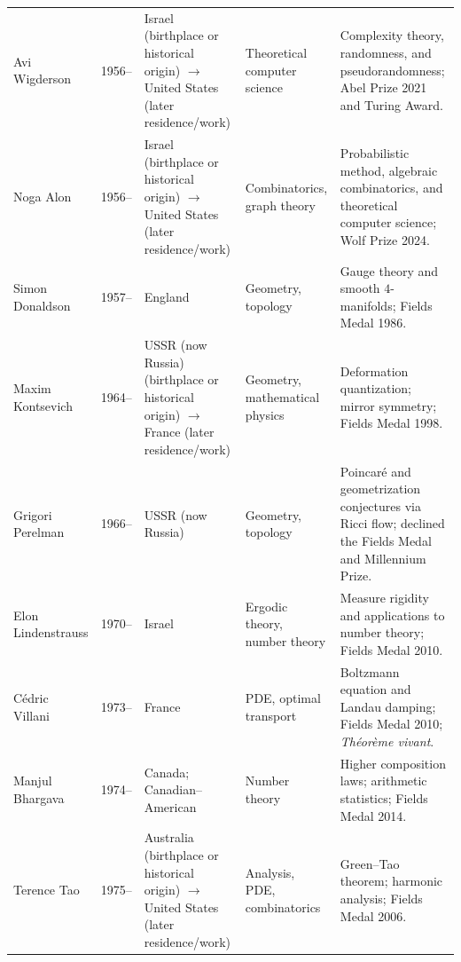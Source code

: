 {\begin{longtable}{@{}L{0.145\textwidth}L{0.09\textwidth}L{0.225\textwidth}L{0.14\textwidth}L{0.30\textwidth}@{}}
        Avi Wigderson
        & 1956--
        & Israel (birthplace or historical origin) \(\to\) United States (later residence/work)
        & Theoretical computer science
        & Complexity theory, randomness, and pseudorandomness; Abel Prize
          2021 and Turing Award. \\

        Noga Alon
        & 1956--
        & Israel (birthplace or historical origin) \(\to\) United States (later residence/work)
        & Combinatorics, graph theory
        & Probabilistic method, algebraic combinatorics, and theoretical
          computer science; Wolf Prize 2024. \\

        Simon Donaldson
        & 1957--
        & England
        & Geometry, topology
        & Gauge theory and smooth $4$-manifolds; Fields Medal 1986. \\

        Maxim Kontsevich
        & 1964--
        & USSR (now Russia) (birthplace or historical origin) \(\to\) France (later residence/work)
        & Geometry, mathematical physics
        & Deformation quantization; mirror symmetry; Fields Medal 1998. \\

        Grigori Perelman
        & 1966--
        & USSR (now Russia)
        & Geometry, topology
        & Poincaré and geometrization conjectures via Ricci flow; declined the
          Fields Medal and Millennium Prize. \\

        Elon Lindenstrauss
        & 1970--
        & Israel
        & Ergodic theory, number theory
        & Measure rigidity and applications to number theory; Fields Medal
          2010. \\

        Cédric Villani
        & 1973--
        & France
        & PDE, optimal transport
        & Boltzmann equation and Landau damping; Fields Medal 2010;
          \textit{Théorème vivant}. \\

        Manjul Bhargava
        & 1974--
        & Canada; Canadian--American
        & Number theory
        & Higher composition laws; arithmetic statistics; Fields Medal 2014. \\

        Terence Tao
        & 1975--
        & Australia (birthplace or historical origin) \(\to\) United States (later residence/work)
        & Analysis, PDE, combinatorics
        & Green--Tao theorem; harmonic analysis; Fields Medal 2006. \\


\end{longtable}}
